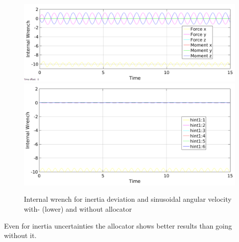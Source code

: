 \documentclass[conference]{IEEEtran}
\begin{document}
\begin{figure}
\includegraphics[width=\linewidth]{IntDevNullSinus}
\includegraphics[width=\linewidth]{IntDevAlloSinus}
\caption{Internal wrench for inertia deviation and sinusoidal angular velocity with- (lower) and without allocator}
\label{IntDevPT1}
\end{figure}
Even for inertia uncertainties the allocator shows better results than going without it.
\end{document}
